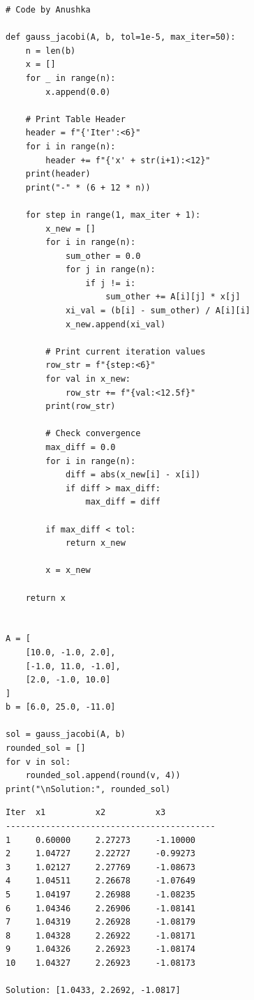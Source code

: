 \documentclass[10pt,a4paper]{report}
\begin{document}
\begin{tcolorbox}[colback=codebg,colframe=secondary,title=\textbf{Python Implementation (Step-by-Step Loops \& Pure Functions)},boxrule=1pt,arc=2mm]
\begin{lstlisting}[style=python_detailed]
# Code by Anushka

def gauss_jacobi(A, b, tol=1e-5, max_iter=50):
    n = len(b)
    x = []
    for _ in range(n):
        x.append(0.0)

    # Print Table Header
    header = f"{'Iter':<6}"
    for i in range(n):
        header += f"{'x' + str(i+1):<12}"
    print(header)
    print("-" * (6 + 12 * n))

    for step in range(1, max_iter + 1):
        x_new = []
        for i in range(n):
            sum_other = 0.0
            for j in range(n):
                if j != i:
                    sum_other += A[i][j] * x[j]
            xi_val = (b[i] - sum_other) / A[i][i]
            x_new.append(xi_val)

        # Print current iteration values
        row_str = f"{step:<6}"
        for val in x_new:
            row_str += f"{val:<12.5f}"
        print(row_str)

        # Check convergence
        max_diff = 0.0
        for i in range(n):
            diff = abs(x_new[i] - x[i])
            if diff > max_diff:
                max_diff = diff

        if max_diff < tol:
            return x_new

        x = x_new

    return x


A = [
    [10.0, -1.0, 2.0],
    [-1.0, 11.0, -1.0],
    [2.0, -1.0, 10.0]
]
b = [6.0, 25.0, -11.0]

sol = gauss_jacobi(A, b)
rounded_sol = []
for v in sol:
    rounded_sol.append(round(v, 4))
print("\nSolution:", rounded_sol)

\end{lstlisting}
\end{tcolorbox}

\begin{tcolorbox}[colback=termbg,colframe=primary,title=\textbf{Program Execution Output \& Convergence Table},boxrule=1pt,arc=2mm]
\begin{lstlisting}[style=terminal_output]
Iter  x1          x2          x3          
------------------------------------------
1     0.60000     2.27273     -1.10000    
2     1.04727     2.22727     -0.99273    
3     1.02127     2.27769     -1.08673    
4     1.04511     2.26678     -1.07649    
5     1.04197     2.26988     -1.08235    
6     1.04346     2.26906     -1.08141    
7     1.04319     2.26928     -1.08179    
8     1.04328     2.26922     -1.08171    
9     1.04326     2.26923     -1.08174    
10    1.04327     2.26923     -1.08173    

Solution: [1.0433, 2.2692, -1.0817]
\end{lstlisting}
\end{tcolorbox}
\end{document}

